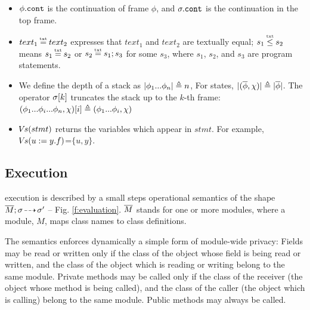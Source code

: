 {\begin{itemize}
have the expected meaning.
\item
$\phi.\mbox{\normalfont{\texttt{cont}}}$ is the continuation of frame $\phi$, and  $\sigma.\mbox{\normalfont{\texttt{cont}}}$ is the continuation in the top frame.
\item
$text_1 \txteq text_2$ expresses that $text_1$ and $text_2$ are textually equal;  
 $s_1 \txtin   s_2$  means  $s_1 \txteq  s_2$ or  $s_2 \txteq  s_1; s_3$ for some $s_3$, where $s_1$, $s_2$, and $s_3$ are program statements. 
\item
We define the depth of a stack as $|\phi_1...\phi_n| \triangleq n$, For states, $|(\overline \phi, \chi)| \triangleq  |\overline \phi|$.
The  operator $\sigma[k]$ truncates the stack up to the $k$-th frame: %
 $(\phi_1...\phi_i...\phi_n,\chi)[i]  \triangleq   (\phi_1...\phi_i,\chi)$
\item
{ ${\hspace{-1pt}V\hspace{-1pt}}s(stmt)$ returns the variables which appear in $stmt$. For example, ${\hspace{-1pt}V\hspace{-1pt}}s(u:=y.f)$=$\{u,y\}$.}
\end{itemize}

  

  
\subsection{\LangOO Execution}
\label{sect:execution}

 \LangOO execution is described by a small steps operational semantics of the shape $\overline{M};\sigma\! \dashrightarrow\! {\sigma'}$ 
 -- {\cf Fig. \ref{f:evaluation}.} 
  $\overline{M}$ stands for one or more modules, where a
  module,  $M$, maps class names to class definitions. 
   
{The semantics enforces dynamically a simple form of module-wide privacy: 
Fields may be read or written only if the class of the object whose field is being read or written, and the class of the object which is reading or writing belong to the same module.}
Private methods may be called only if the class of the receiver (the object whose method is being called), and the class of the caller (the object which is calling) belong to the same module.
Public methods may always be called.

}
